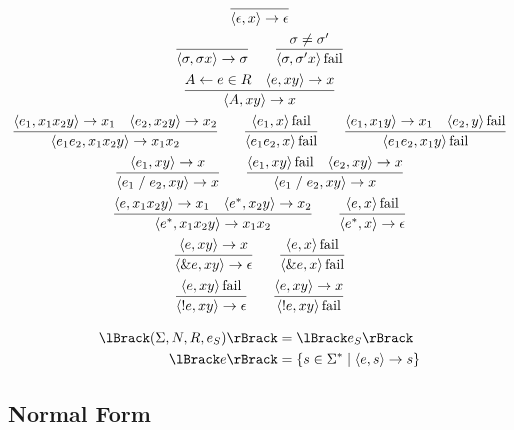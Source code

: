 \begin{gather*}
  \infer{\langle \epsilon, x\rangle \to \epsilon}{}
  \\
  \infer{\langle \sigma, \sigma x\rangle \to \sigma}{}
  \hspace{2em}
  \infer{\langle \sigma, \sigma' x\rangle \symfail}{
    \sigma \neq \sigma'
  }
  \\
  \infer{\langle A, xy\rangle \to x}{
    A \assign e \in R
    &
    \langle e, xy\rangle \to x
  }
  \\
  \infer{\langle e_1e_2, x_1x_2y\rangle \to x_1x_2}{
    \langle e_1, x_1x_2y\rangle \to x_1
    &
    \langle e_2, x_2y\rangle \to x_2
  }
  \hspace{2em}
  \infer{\langle e_1e_2, x\rangle \symfail}{
    \langle e_1, x\rangle \symfail
  }
  \hspace{2em}
  \infer{\langle e_1e_2, x_1y\rangle \symfail}{
    \langle e_1, x_1y\rangle \to x_1
    &
    \langle e_2, y\rangle \symfail
  }
  \\
  \infer{\langle e_1 \mathrel{/} e_2, xy\rangle \to x}{
    \langle e_1, xy\rangle \to x
  }
  \hspace{2em}
  \infer{\langle e_1 \mathrel{/} e_2, xy\rangle \to x}{
    \langle e_1, xy\rangle \symfail
    &
    \langle e_2, xy\rangle \to x
  }
  \\
  \infer{\langle e^*, x_1x_2y\rangle \to x_1x_2}{
    \langle e, x_1x_2y\rangle \to x_1
    &
    \langle e^*, x_2y\rangle \to x_2
  }
  \hspace{2em}
  \infer{\langle e^*, x\rangle \to \epsilon}{
    \langle e, x\rangle \symfail
  }
  \\
  \infer{\langle \& e, xy\rangle \to \epsilon}{
    \langle e, xy\rangle \to x
  }
  \hspace{2em}
  \infer{\langle \& e, x\rangle \symfail}{
    \langle e, x\rangle \symfail
  }
  \\
  \infer{\langle !e, xy\rangle \to \epsilon}{
    \langle e, xy\rangle \symfail
  }
  \hspace{2em}
  \infer{\langle !e, xy\rangle \symfail}{
    \langle e, xy\rangle \to x
  }
\end{gather*}

\begin{align*}
  \semanticf{(\Sigma, N, R, e_S)} &= \semanticf{e_S} \\
  \semanticf{e} &= \{s \in \Sigma^* \mid \langle e, s\rangle \to s\}
\end{align*}

\subsection{Normal Form}

